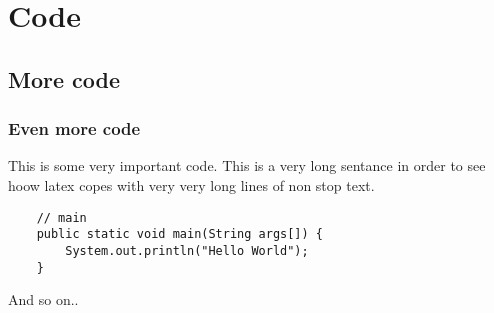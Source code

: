 \documentclass[a4paper,12pt]{article}
\begin{document}
	
	
	
	
	
	
	
	
	
	
	
	

\section{Code}
\subsection{More code}
\subsubsection{Even more code}
This is some very important code.
This is a very long sentance in order to see hoow latex copes with very very long lines of non stop text.
\begin{lstlisting}
	// main
	public static void main(String args[]) {
		System.out.println("Hello World");
	}
\end{lstlisting}

And so on..
\end{document}
